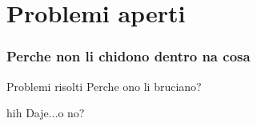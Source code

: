 \section{Problemi aperti}
\begin{frame}[plain]
  \frametitle{Perche non li chidono dentro na cosa}
  \begin{block}{Problemi risolti}
    Perche ono li bruciano?
  \end{block}
  \begin{block}{hih}
    Daje...o no?
  \end{block}
\end{frame}
